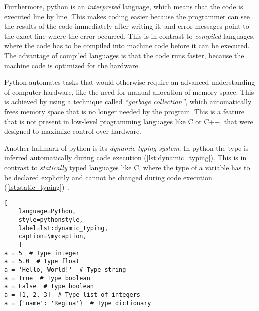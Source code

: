 Furthermore, python is an \textit{interpreted} language, which means that the
code is executed line by line. This makes coding easier because the programmer
can see the results of the code immediately after writing it, and error messages
point to the exact line where the error occurred. This is in contrast to
\textit{compiled} languages, where the code has to be compiled into machine code
before it can be executed. The advantage of compiled languages is that the code
runs faster, because the machine code is optimized for the hardware.

Python automates tasks that would otherwise require an advanced understanding of
computer hardware, like the need for manual allocation of memory space. This is
achieved by using a technique called \textit{``garbage collection''}, which
automatically frees memory space that is no longer needed by the program. This
is a feature that is not present in low-level programming languages like C or
C++, that were designed to maximize control over hardware.

Another hallmark of python is its \textit{dynamic typing system}. In python the type  is
inferred automatically during code execution (\autoref{lst:dynamic_typing}).
This is in contrast to \textit{statically} typed languages like C, where the type of a
variable has to be declared explicitly and cannot be changed during code
execution (\autoref{lst:static_typing})~\cite{PythonLanguageReference}.
\def\mycaption{ Example of dynamic typing in python. The variable ``\texttt{a}''
    is assigned the value 5, which is an integer. The variable ``\texttt{a}'' is
    then assigned the value ``\texttt{Hello, World!}'', which is a string.
    Python allows  Note that code after ``\texttt{\#}'' is considered a comment
    and won't be executed.}
\begin{lstlisting}[
    language=Python,
    style=pythonstyle,
    label=lst:dynamic_typing,
    caption=\mycaption,
    ]
a = 5  # Type integer
a = 5.0  # Type float
a = 'Hello, World!'  # Type string
a = True  # Type boolean
a = False  # Type boolean
a = [1, 2, 3]  # Type list of integers
a = {'name': 'Regina'}  # Type dictionary
\end{lstlisting}

